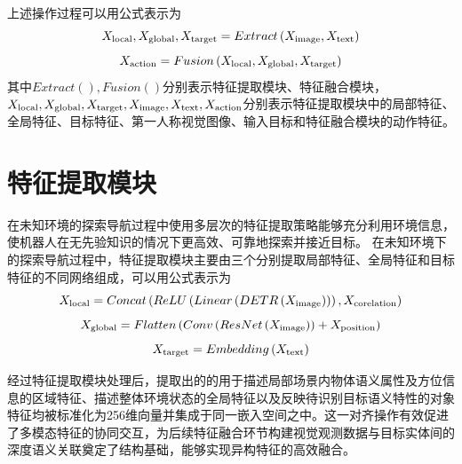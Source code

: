 上述操作过程可以用公式表示为
\begin{equation}
    {X_{{\rm{local}}}},{X_{{\rm{global}}}},{X_{{\rm{target}}}} = Extract\left( {{X_{{\rm{image}}}},{X_{{\rm{text}}}}} \right)
    \label{myeq30}
\end{equation}
\begin{equation}
    {X_{{\rm{action}}}} = Fusion\left( {{X_{{\rm{local}}}},{X_{{\rm{global}}}},{X_{{\rm{target}}}}} \right)
    \label{myeq31}
\end{equation}
其中$Extract\left( {} \right),Fusion\left( {} \right)$分别表示特征提取模块、特征融合模块，${X_{{\rm{local}}}},{X_{{\rm{global}}}},{X_{{\rm{target}}}},{X_{{\rm{image}}}},{X_{{\rm{text}}}},{X_{{\rm{action}}}}$分别表示特征提取模块中的局部特征、全局特征、目标特征、第一人称视觉图像、输入目标和特征融合模块的动作特征。



\section{特征提取模块}
在未知环境的探索导航过程中使用多层次的特征提取策略能够充分利用环境信息，使机器人在无先验知识的情况下更高效、可靠地探索并接近目标。
在未知环境下的探索导航过程中，特征提取模块主要由三个分别提取局部特征、全局特征和目标特征的不同网络组成，可以用公式表示为
\begin{equation}
{X_{{\rm{local}}}} = Concat\left( {ReLU\left( {Linear\left( {DETR\left( {{X_{{\rm{image}}}}} \right)} \right)} \right),{X_{{\rm{corelation}}}}} \right)
    \label{myeq32}
\end{equation}
\begin{equation}
{X_{{\rm{global}}}} = Flatten\left( {Conv\left( {ResNet\left( {{X_{{\rm{image}}}}} \right)} \right) + {X_{{\rm{position}}}}} \right)
    \label{myeq33}
\end{equation}
\begin{equation}
{X_{{\rm{target}}}} = Embedding\left( {{X_{{\rm{text}}}}} \right)
    \label{myeq34}
\end{equation}

经过特征提取模块处理后，提取出的的用于描述局部场景内物体语义属性及方位信息的区域特征、描述整体环境状态的全局特征以及反映待识别目标语义特性的对象特征均被标准化为256维向量并集成于同一嵌入空间之中。这一对齐操作有效促进了多模态特征的协同交互，为后续特征融合环节构建视觉观测数据与目标实体间的深度语义关联奠定了结构基础，能够实现异构特征的高效融合。

